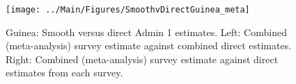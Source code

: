 \documentclass[12pt]{article}\usepackage[]{graphicx}\usepackage[]{color}
\newenvironment{knitrout}{}{} %
\begin{document}

\begin{knitrout}
\color{fgcolor}\begin{figure}[bht]

{\centering \texttt{[image: ../Main/Figures/SmoothvDirectGuinea\_meta]} 

}

\caption[Guinea]{Guinea: Smooth versus direct Admin 1 estimates. Left: Combined (meta-analysis) survey estimate against combined direct estimates. Right: Combined (meta-analysis) survey estimate against direct estimates from each survey.}\label{fig:unnamed-chunk-153}
\end{figure}


\end{knitrout}
\end{document}
